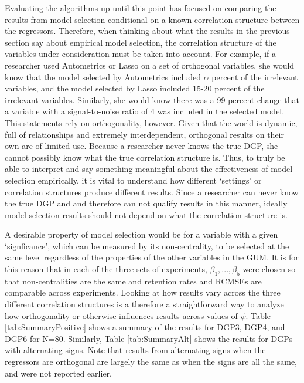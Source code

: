 \documentclass[11pt, oneside]{book}   	%
\begin{document}
Evaluating the algorithms up until this point has focused on comparing the results from model selection conditional on a known correlation structure between the regressors. Therefore, when thinking about what the results in the previous section say about empirical model selection, the correlation structure of the variables under consideration must be taken into account. For example, if a researcher used Autometrics or Lasso on a set of orthogonal variables, she would know that the model selected by Autometrics included $\alpha$ percent of the irrelevant variables, and the model selected by Lasso included 15-20 percent of the irrelevant variables. Similarly, she would know there was a 99 percent change that a variable with a signal-to-noise ratio of 4 was included in the selected model. This statements rely on orthogonality, however. Given that the world is dynamic, full of relationships and extremely interdependent, orthogonal results on their own are of limited use. Because a researcher never knows the true DGP, she cannot possibly know what the true correlation structure is. Thus, to truly be able to interpret and say something meaningful about the effectiveness of model selection empirically, it is vital to understand how different `settings' or correlation structures produce different results. Since a researcher can never know the true DGP and and therefore can not qualify results in this manner, ideally model selection results should not depend on what the correlation structure is.

A desirable property of model selection would be for a variable with a given `signficance', which can be measured by its non-centrality, to be selected at the same level regardless of the properties of the other variables in the GUM. It is for this reason that in each of the three sets of experiments, $\beta_{1},...,\beta_{5}$ were chosen so that non-centralities are the same and retention rates and RCMSEs are comparable across experiments. Looking at how results vary across the three different correlation structures is a therefore a straightforward way to analyze how orthogonality or otherwise influences results across values of $\psi$. Table \ref{tab:SummaryPositive} shows a summary of the results for DGP3, DGP4, and DGP6 for N=80. Similarly, Table \ref{tab:SummaryAlt} shows the results for DGPs with alternating signs. Note that results from alternating signs when the regressors are orthogonal are largely the same as when the signs are all the same, and were not reported earlier. 

\end{document}
